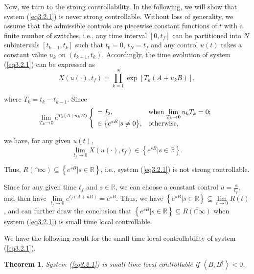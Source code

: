 \documentclass[onecolumn,showpacs,showkeys,preprintnumbers]{revtex4}
\newtheorem{theorem}{Theorem}[section]
\begin{document}
Now, we turn to the strong controllability. In the following, we
will show that system (\ref{eq3.2.1}) is never strong
controllable. Without loss of generality, we assume that the
admissible controls are piecewise constant functions of $t$ with a
finite number of switches, i.e., any time interval $[0, t_f]$ can
be partitioned into $N$ subintervals $[t_{k-1}, t_k]$ such that
$t_0=0$, $t_N=t_f$ and any control $u(t)$ takes a constant value
$u_k$ on $(t_{k-1}, t_k)$. Accordingly, the time evolution of
system (\ref{eq3.2.1}) can be
expressed as\noindent\begin{equation}\label{eq3.2.17}
X(u(\cdot),t_f)=\prod_{k=1}^{N}\exp[T_k(A+u_kB)],
\end{equation}

\noindent where $T_k=t_k-t_{k-1}$. Since\noindent\begin{equation}\label{eq3.2.18}\lim\limits_{T_k\rightarrow0}e^{T_k(A+u_kB)}\left\{\begin{array}{ll}
    =I_2, & \hbox{when $\lim\limits_{T_k\rightarrow0}u_kT_k=0$;} \\
    \in{\left\{e^{sB}|s\neq0\right\}}, & \hbox{otherwise,} \\
\end{array}\right.
\end{equation}

\noindent we have, for any given $u(t)$,
\noindent\begin{equation}\label{eq3.2.18}\lim\limits_{t_f\rightarrow0}X(u(\cdot),t_f)\in{\left\{e^{sB}|s\in\mathbb{R}\right\}}.
\end{equation}

\noindent Thus,
$R(\cap{\infty})\subseteq{\left\{e^{sB}|s\in\mathbb{R}\right\}}$,
i.e., system (\ref{eq3.2.1}) is not strong controllable.

Since for any given time $t_f$ and $s\in\mathbb{R}$, we can choose
a constant control $\bar{u}=\frac{s}{t_f}$, and then have
$\lim\limits_{t_f\rightarrow0}e^{t_f(A+\bar{u}B)}=e^{sB}$. Thus,
we have
${\left\{e^{sB}|s\in\mathbb{R}\right\}}\subseteq\lim\limits_{t\rightarrow0}\overline{R(t)}$,
and can further draw the conclusion that
${\left\{e^{sB}|s\in\mathbb{R}\right\}}{\subseteq}\overline{R(\cap{\infty})}$
when system (\ref{eq3.2.1}) is small time local controllable.

We have the following result for the small time local
controllability of system (\ref{eq3.2.1}).

\noindent\begin{theorem}\label{theorem3.2.5}System (\ref{eq3.2.1}) is small time local controllable if
$\left<B,B^\dag\right><0$.
\end{theorem}
\end{document}
